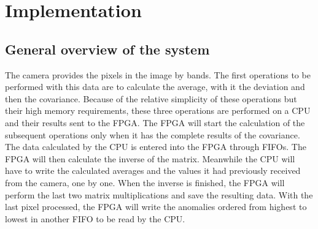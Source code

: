 
\cleardoublepage

\chapter{Implementation}
\label{makereference}

\section{General overview of the system}
The camera provides the pixels in the image by bands. The first operations to be performed with this data are to calculate the average, with it the deviation and then the covariance. Because of the relative simplicity of these operations but their high memory requirements, these three operations are performed on a CPU and their results sent to the FPGA. The FPGA will start the calculation of the subsequent operations only when it has the complete results of the covariance.
The data calculated by the CPU is entered into the FPGA through FIFOs.
The FPGA will then calculate the inverse of the matrix. Meanwhile the CPU will have to write the calculated averages and the values it had previously received from the camera, one by one. When the inverse is finished, the FPGA will perform the last two matrix multiplications and save the resulting data. With the last pixel processed, the FPGA will write the anomalies ordered from highest to lowest in another FIFO to be read by the CPU.
\pagebreak

